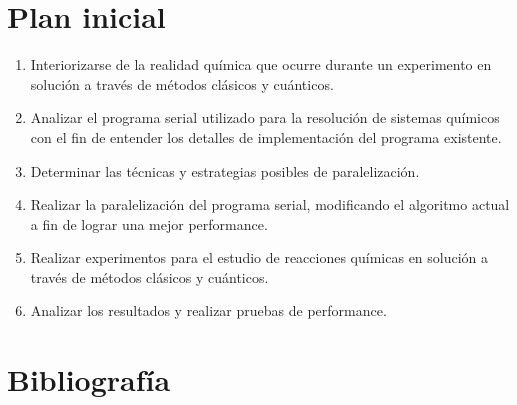 \documentclass[a4paper, 12pt]{article}
\begin{document}
\section*{Plan inicial}

\begin{enumerate}
\item Interiorizarse de la realidad qu\'imica que ocurre durante un experimento en soluci\'on a trav\'es de m\'etodos cl\'asicos y cu\'anticos.

\item Analizar el programa serial utilizado para la resoluci\'on de sistemas qu\'imicos con el fin de entender los detalles de implementaci\'on del programa existente.

\item Determinar las t\'ecnicas y estrategias posibles de paralelizaci\'on.

\item Realizar la paralelizaci\'on del programa serial, modificando el algoritmo actual a fin de lograr una mejor performance.

\item Realizar experimentos para el estudio de reacciones qu\'imicas en soluci\'on a trav\'es de m\'etodos cl\'asicos y cu\'anticos.

\item Analizar los resultados y realizar pruebas de performance.

\end{enumerate}

\section*{Bibliograf\'ia}
\end{document}
